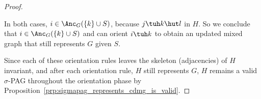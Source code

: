 \begin{proof}
\begin{description}
%
      In both cases, $i \in \Anc_G(\{k\} \cup S)$, because $j \tuh k \hut l$ in $H$.
      So we conclude that $i \in \Anc_G(\{k\} \cup S)$ and can orient $i \tuh k$ to obtain an updated mixed graph that still represents $G$ given $S$.
  \end{description}
  Since each of these orientation rules leaves the skeleton (adjacencies) of $H$ invariant,
  and after each orientation rule, $H$ still represents $G$,
  $H$ remains a valid $\sigma$-PAG throughout the orientation phase
  by Proposition~\ref{prp:sigmapag_represents_cdmg_is_valid}. 
\end{proof}

